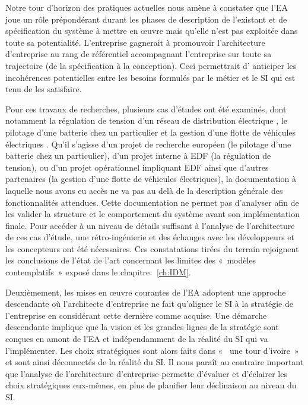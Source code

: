 Notre tour d'horizon des pratiques actuelles nous amène à constater que l'EA
joue un rôle prépondérant durant les phases de description de l'existant et de
spécification du système à mettre en œuvre mais qu'elle n'est pas exploitée dans
toute sa potentialité. L'entreprise gagnerait à promouvoir l'architecture
d'entreprise au rang de référentiel accompagnant l'entreprise sur toute sa
trajectoire (de la spécification à la conception). Ceci permettrait d' anticiper
les incohérences potentielles entre les besoins formulés par le métier et le SI
qui est tenu de les satisfaire.

Pour ces travaux de recherches, plusieurs cas d'études ont été examinés,
dont notamment la régulation de tension d'un réseau de distribution électrique
\cite{seghiri2014simulation}, le pilotage d'une batterie chez un particulier
\cite{seghiri2012animation} et la gestion d'une flotte de véhicules électriques
\cite{seghiri2015simulation}. Qu'il s'agisse d'un projet de recherche européen
(le pilotage d'une batterie chez un particulier), d'un projet interne à EDF (la
régulation de tension), ou d'un projet opérationnel impliquant EDF ainsi que
d'autres partenaires (la gestion d'une flotte de véhicules électriques),
la documentation à laquelle nous avons eu accès ne va pas au delà
de la description générale des fonctionnalités attendues. Cette documentation
ne permet pas d'analyser afin de les valider la structure et le comportement du
système avant son implémentation finale. Pour accéder à un niveau de détails
suffisant à l'analyse de l'architecture de ces cas d'étude, une rétro-ingénierie
et des échanges avec les développeurs et les concepteurs ont été
nécessaires. Ces constatations tirées du terrain rejoignent les conclusions de
l'état de l'art concernant les limites des «~modèles contemplatifs~» exposé
dans le chapitre ~\ref{ch:IDM}.

Deuxièmement, les mises en œuvre courantes de l'EA adoptent une approche
descendante où l'architecte d'entreprise ne fait qu'aligner le SI à la stratégie
de l'entreprise en considérant cette dernière comme acquise. Une démarche
descendante implique que la vision et les grandes lignes de la stratégie sont
conçues en amont de l'EA et indépendamment de la réalité du SI qui va
l'implémenter. Les choix stratégiques sont alors faits dans «~ une tour d'ivoire~»
et sont ainsi déconnectés de la réalité du SI. Il nous paraît au contraire
important que l'analyse de l'architecture d'entreprise permette d'évaluer et
d'éclairer les choix stratégiques eux-mêmes, en plus de planifier leur
déclinaison au niveau du SI.

